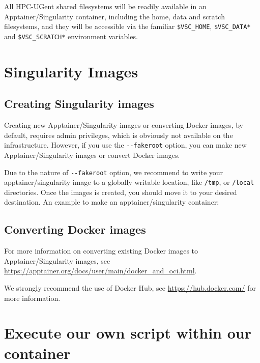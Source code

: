 All HPC-UGent shared filesystems will be readily available in an Apptainer/Singularity container,
including the home, data and scratch filesystems, and they will be accessible via the
familiar \lstinline|$VSC_HOME|, \lstinline|$VSC_DATA*| and \lstinline|$VSC_SCRATCH*| environment variables.

\section{Singularity Images}

\subsection{Creating Singularity images}

Creating new Apptainer/Singularity images or converting Docker images, by default, requires admin privileges,
which is obviously not available on the \hpcInfra infrastructure. However,
if you use the \lstinline|--fakeroot| option, you can make new Apptainer/Singularity images or convert 
Docker images. 

Due to the nature of \lstinline|--fakeroot| option, we recommend to write your apptainer/singularity
image to a globally writable location, like \lstinline|/tmp|, or \lstinline|/local| directories. 
Once the images is created, you should move it to your desired destination.
An example to make an apptainer/singularity container:

\begin{prompt}
\end{prompt}

\subsection{Converting Docker images}

For more information on converting existing Docker images to Apptainer/Singularity images,
see \url{https://apptainer.org/docs/user/main/docker_and_oci.html}.

We strongly recommend the use of Docker Hub, see \url{https://hub.docker.com/} for more information.

\section{Execute our own script within our container}

